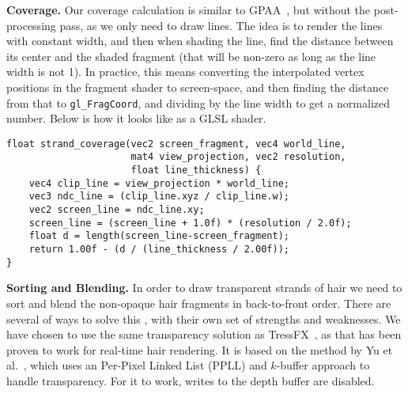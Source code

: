 \documentclass{egpubl}
\begin{document}

\noindent \textbf{Coverage. } Our coverage calculation is similar to GPAA~\cite{persson2012geometric}, but without the post-processing pass, as we only need to draw lines. The idea is to render the lines with constant width, and then when shading the line, find the distance between its center and the shaded fragment (that will be non-zero as long as the line width is not 1). In practice, this means converting the interpolated vertex positions in the fragment shader to screen-space, and then finding the distance from that to \texttt{gl\_FragCoord}, and dividing by the line width to get a normalized number. Below is how it looks like as a GLSL shader.

  \vspace{+0.8em}

\begin{lstlisting}
float strand_coverage(vec2 screen_fragment, vec4 world_line,
                      mat4 view_projection, vec2 resolution,
                      float line_thickness) {
    vec4 clip_line = view_projection * world_line;
    vec3 ndc_line = (clip_line.xyz / clip_line.w);
    vec2 screen_line = ndc_line.xy;
    screen_line = (screen_line + 1.0f) * (resolution / 2.0f);
    float d = length(screen_line-screen_fragment);
    return 1.00f - (d / (line_thickness / 2.00f));
}
\end{lstlisting}


\noindent \textbf{Sorting and Blending. } In order to draw transparent strands of hair we need to sort and blend the non-opaque hair fragments in back-to-front order. There are several of ways to solve this \cite{maule2011survey}, with their own set of strengths and weaknesses. We have chosen to use the same transparency solution as TressFX~\cite{martin2014tressfx}, as that has been proven to work for real-time hair rendering. It is based on the method by Yu et al.~\cite{yu2012framework}, which uses an Per-Pixel Linked List (PPLL) \cite{yang2010real} and $k$-buffer approach \cite{bavoil2007multi} to handle transparency. For it to work, writes to the depth buffer are disabled.
\end{document}
